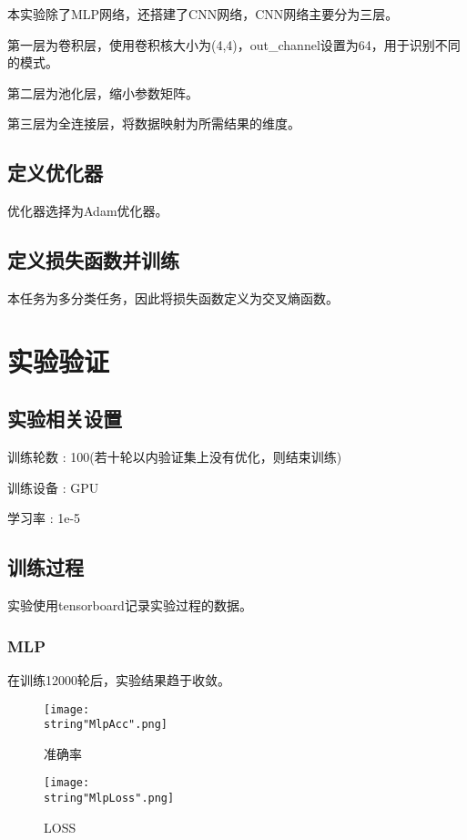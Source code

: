 \documentclass[UTF8]{ctexart}
\begin{document}
本实验除了MLP网络，还搭建了CNN网络，CNN网络主要分为三层。\par
第一层为卷积层，使用卷积核大小为(4,4)，out\_channel设置为64，用于识别不同的模式。\par 
第二层为池化层，缩小参数矩阵。\par
第三层为全连接层，将数据映射为所需结果的维度。\par

\subsection{定义优化器}
优化器选择为Adam优化器。
\subsection{定义损失函数并训练}
本任务为多分类任务，因此将损失函数定义为交叉熵函数。

\section{实验验证}
\subsection{实验相关设置}
训练轮数 : 100(若十轮以内验证集上没有优化，则结束训练)\par
训练设备 : GPU\par 
学习率 : 1e-5\par 
\subsection{训练过程}
实验使用tensorboard记录实验过程的数据。\par
\subsubsection{MLP}

在训练12000轮后，实验结果趋于收敛。\par
\begin{figure}[H]
    \begin{center}
        \texttt{[image: \\string"MlpAcc".png]}
    \caption{准确率}
    \label{fig:1}
    \end{center}
    \end{figure}
\par

\begin{figure}[H]
    \begin{center}
        \texttt{[image: \\string"MlpLoss".png]}
    \caption{LOSS}
    \label{fig:2}
    \end{center}
    \end{figure}
\par
\end{document}
